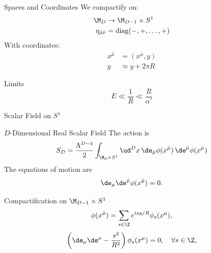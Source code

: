 \begin{frame}
	\begin{block}{Spaces and Coordinates}
		We compactify on:
		\begin{align*}
			\M_D                      & \to \M_{D-1} \times S^1    \\
			\eta_{\hat{\mu}\hat{\nu}} & = \text{diag}(-,+,\dots,+)
		\end{align*}
		With coordinates:
		\begin{align*}
			x^{\hat{\mu}} & = (x^\mu, y)      \\
			y             & \simeq y + 2\pi R
		\end{align*}
	\end{block}
	\begin{block}{Limits}
		\begin{equation*}
			E \ll \frac{1}{R} \ll \frac{R}{\alpha'}
		\end{equation*}
	\end{block}
\end{frame}

\begin{frame}{Scalar Field on \texorpdfstring{$S^1$}{S1}}
	\begin{block}{\texorpdfstring{$D$}{D}-Dimensional Real Scalar Field}
		The action is
		\begin{equation*}
			S_{D} = \frac{\Lambda^{D-4}}{2} \int_{\M_{d} \times S^1} \ud^D x \,  \de_{\hat{\mu}} \phi(x^{\hat{\mu}}) \, \de^{\hat{\mu}} \phi(x^{\hat{\mu}})
		\end{equation*}
		The equations of motion are
		\begin{equation*}
			\de_{\hat{\mu}} \de^{\hat{\mu}}  \phi(x^{\hat{\mu}}) = 0.
		\end{equation*}
	\end{block}

	\begin{block}{Compactification on \texorpdfstring{$\M_{D-1} \times S^1$}{M(D-1)xS1}}
		\begin{equation*}
			\phi(x^{\hat{\mu}}) = \sum_{s \in \Z} e^{isy/R} \phi_s(x^\mu),
		\end{equation*}
		\begin{equation*}
			\left( \de_\mu \de^\mu - \frac{s^2}{R^2} \right) \phi_s(x^\mu) = 0, \quad \forall s \in \Z,
		\end{equation*}
	\end{block}

\end{frame}

